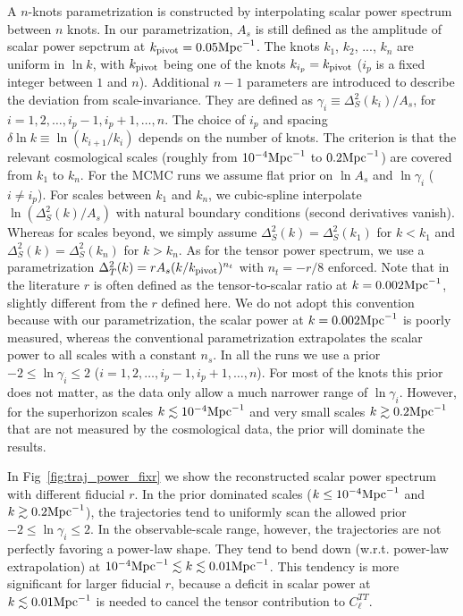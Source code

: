 \documentclass[11pt]{article}
\begin{document}
A $n$-knots parametrization is constructed by interpolating scalar power spectrum between $n$ knots. In our parametrization,  $A_s$ is still defined as the amplitude of scalar power sepctrum at $k_{\rm pivot}=0.05 {\rm Mpc}^{-1}$. The knots $k_1$, $k_2$, ..., $k_n$ are uniform in $\ln k$, with $k_{\rm pivot}$ being one of the knots $k_{i_p} = k_{\rm pivot}$ ($i_p$ is a fixed integer between $1$ and $n$). Additional $n-1$ parameters are introduced to describe the deviation from scale-invariance. They are defined as $\gamma_i\equiv \Delta^2_S(k_i)/ A_s$, for $i = 1, 2, \ldots, i_p - 1, i_p+1, \ldots, n$.  The choice of $i_p$ and spacing $\delta\ln k \equiv \ln (k_{i+1}/k_i)$ depends on the number of knots. The criterion is that the relevant cosmological scales (roughly from $10^{-4}{\rm Mpc}^{-1}$ to $0.2 {\rm Mpc}^{-1}$) are covered from $k_1$ to $k_n$. For the MCMC runs we assume flat prior on $\ln A_s$ and $\ln \gamma_i$ ($i\neq i_p$). For scales between $k_1$ and $k_n$, we cubic-spline interpolate $\ln (\Delta^2_S(k)/A_s)$ with natural boundary conditions (second derivatives vanish). Whereas for scales beyond, we simply assume $\Delta^2_S(k) = \Delta^2_S(k_1)$ for $k<k_1$ and $\Delta^2_S(k) = \Delta^2_S(k_n)$ for $k>k_n$. As for the tensor power spectrum, we use a parametrization $\Delta^2_T(k) = r A_s (k/k_{\rm pivot})^{n_t}$ with $n_t = -r/8$ enforced. Note that in the literature $r$ is often defined as the tensor-to-scalar ratio at $k=0.002 {\rm Mpc}^{-1}$, slightly different from the $r$ defined here. We do not adopt this convention because with our parametrization, the scalar power at $k=0.002 {\rm Mpc}^{-1}$ is poorly measured, whereas the conventional parametrization extrapolates the scalar power to all scales with a constant $n_s$. In all the runs we use a prior $-2 \le \ln \gamma_i \le 2$ ($i = 1, 2, \ldots, i_p - 1, i_p+1, \ldots, n$). For most of the knots this prior does not matter, as the data only allow a much narrower range of $\ln \gamma_i$. However, for the superhorizon scales $k\lesssim 10^{-4} {\rm Mpc}^{-1}$ and very small scales $k\gtrsim 0.2 {\rm Mpc}^{-1}$ that are not measured by the cosmological data, the prior will dominate the results. 

In Fig~\ref{fig:traj_power_fixr} we show the reconstructed scalar power spectrum with different fiducial $r$. In the prior dominated scales ($k\le 10^{-4} {\rm Mpc}^{-1}$ and $k\gtrsim 0.2 {\rm Mpc}^{-1}$), the trajectories tend to uniformly scan the allowed prior $-2\le \ln \gamma_i\le 2$. In the observable-scale range, however, the trajectories are not perfectly favoring a power-law shape. They tend to bend down (w.r.t. power-law extrapolation) at $10^{-4} {\rm Mpc}^{-1} \lesssim k \lesssim 0.01 {\rm Mpc}^{-1}$. This tendency is more significant for larger fiducial $r$, because a deficit in scalar power at $k\lesssim 0.01 {\rm Mpc}^{-1}$ is needed to cancel the tensor contribution to $C_\ell^{TT}$. 
\end{document}

